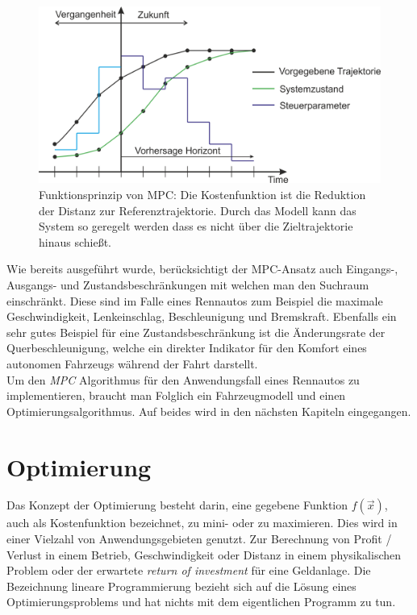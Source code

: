 \documentclass{like}
\begin{document}
\begin{figure}[ht!]
	\centering
	\includegraphics[width=350pt]{Abbildungen/mpcParadigm.png}
	\caption{Funktionsprinzip von \ac{MPC}: Die Kostenfunktion ist die Reduktion der Distanz zur Referenztrajektorie. Durch das Modell kann das System so geregelt werden dass es nicht über die Zieltrajektorie hinaus schießt.}
	\label{fig:mpcTheory}
\end{figure}

Wie bereits ausgeführt wurde, berücksichtigt der \ac{MPC}-Ansatz auch Eingangs-, Ausgangs- und Zustandsbeschränkungen mit welchen man den Suchraum einschränkt. Diese sind im Falle eines Rennautos zum Beispiel die maximale Geschwindigkeit, Lenkeinschlag, Beschleunigung und Bremskraft. Ebenfalls ein sehr gutes Beispiel für eine Zustandsbeschränkung ist die Änderungsrate der Querbeschleunigung, welche ein direkter Indikator für den Komfort eines autonomen Fahrzeugs während der Fahrt darstellt.\\

Um den \textit{\acl{MPC}} Algorithmus für den Anwendungsfall eines Rennautos zu implementieren, braucht man Folglich ein Fahrzeugmodell und einen Optimierungsalgorithmus. Auf beides wird in den nächsten Kapiteln eingegangen.


\section{Optimierung}
Das Konzept der Optimierung besteht darin, eine gegebene Funktion \(f(\vec{x})\), auch als Kostenfunktion bezeichnet, zu mini- oder zu maximieren. 
Dies wird in einer Vielzahl von Anwendungsgebieten genutzt.
Zur Berechnung von Profit / Verlust in einem Betrieb, Geschwindigkeit oder Distanz in einem physikalischen Problem oder der erwartete \textit{return of investment} für eine Geldanlage.  
Die Bezeichnung lineare Programmierung bezieht sich auf die Lösung eines  Optimierungsproblems und hat nichts mit dem eigentlichen Programm zu tun.
\end{document}
